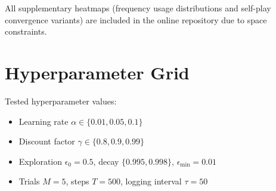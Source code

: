 \documentclass[conference]{IEEEtran}
\begin{document}
All supplementary heatmaps (frequency usage distributions and self-play convergence variants) are included in the online repository due to space constraints.

\section{Hyperparameter Grid}
Tested hyperparameter values:
\begin{itemize}
  \item Learning rate $\alpha \in \{0.01,0.05,0.1\}$
  \item Discount factor $\gamma \in \{0.8,0.9,0.99\}$
  \item Exploration $\epsilon_{0}=0.5$, decay $\{0.995,0.998\}$, $\epsilon_{\min}=0.01$
  \item Trials $M=5$, steps $T=500$, logging interval $\tau=50$
\end{itemize}



\end{document}

